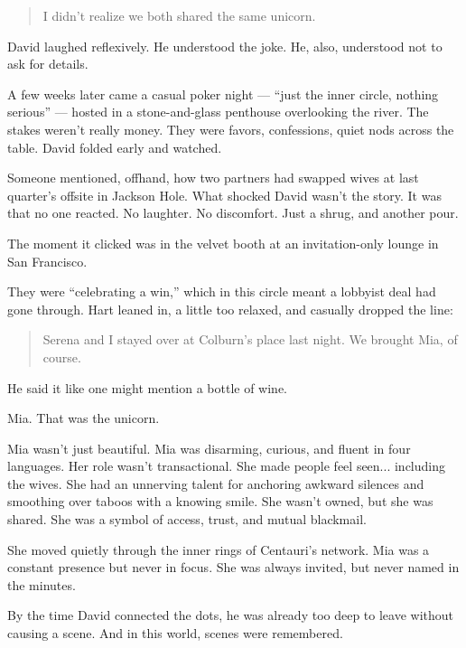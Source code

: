 \begin{quote}
  I didn’t realize we both shared the same unicorn.
\end{quote}  

David laughed reflexively. He understood the joke. He, also, understood not to ask for details.

A few weeks later came a casual poker night — ``just the inner circle, nothing serious'' — hosted in a stone-and-glass penthouse 
overlooking the river. The stakes weren’t really money. They were favors, confessions, quiet nods across the table. David 
folded early and watched.

Someone mentioned, offhand, how two partners had swapped wives at last quarter’s offsite in Jackson Hole.  
What shocked David wasn’t the story. It was that no one reacted. No laughter. No discomfort. Just a shrug, and another pour.

The moment it clicked was in the velvet booth at an invitation-only lounge in San Francisco.

They were ``celebrating a win,'' which in this circle meant a lobbyist deal had gone through. Hart leaned in, 
a little too relaxed, and casually dropped the line:

\begin{quote}
  Serena and I stayed over at Colburn’s place last night. We brought Mia, of course.
\end{quote}

He said it like one might mention a bottle of wine. 

Mia. That was the unicorn.  

Mia wasn’t just beautiful. Mia was disarming, curious, and fluent in four languages. Her role wasn’t transactional. 
She made people feel seen... including the wives. She had an unnerving talent for anchoring awkward silences and 
smoothing over taboos with a knowing smile. She wasn’t owned, but she was shared. She was  a symbol of access, trust, 
and mutual blackmail.

She moved quietly through the inner rings of Centauri’s network. Mia was a constant presence but never in focus. She was 
always invited, but never named in the minutes.  

By the time David connected the dots, he was already too deep to leave without causing a scene.  
And in this world, scenes were remembered.

\medskip

